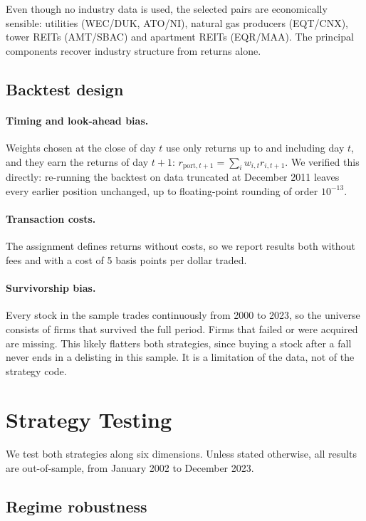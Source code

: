 \documentclass[12pt,letterpaper]{article}
\begin{document}
Even though no industry data is used, the selected pairs are economically sensible: utilities (WEC/DUK, ATO/NI), natural gas producers (EQT/CNX), tower REITs (AMT/SBAC) and apartment REITs (EQR/MAA). The principal components recover industry structure from returns alone.

\subsection{Backtest design}

\paragraph{Timing and look-ahead bias.} Weights chosen at the close of day $t$ use only returns up to and including day $t$, and they earn the returns of day $t+1$: $r_{\text{port},t+1} = \sum_i w_{i,t} r_{i,t+1}$. We verified this directly: re-running the backtest on data truncated at December 2011 leaves every earlier position unchanged, up to floating-point rounding of order $10^{-13}$.

\paragraph{Transaction costs.} The assignment defines returns without costs, so we report results both without fees and with a cost of 5 basis points per dollar traded.

\paragraph{Survivorship bias.} Every stock in the sample trades continuously from 2000 to 2023, so the universe consists of firms that survived the full period. Firms that failed or were acquired are missing. This likely flatters both strategies, since buying a stock after a fall never ends in a delisting in this sample. It is a limitation of the data, not of the strategy code.

\section{Strategy Testing}

We test both strategies along six dimensions. Unless stated otherwise, all results are out-of-sample, from January 2002 to December 2023.

\subsection{Regime robustness}
\end{document}
